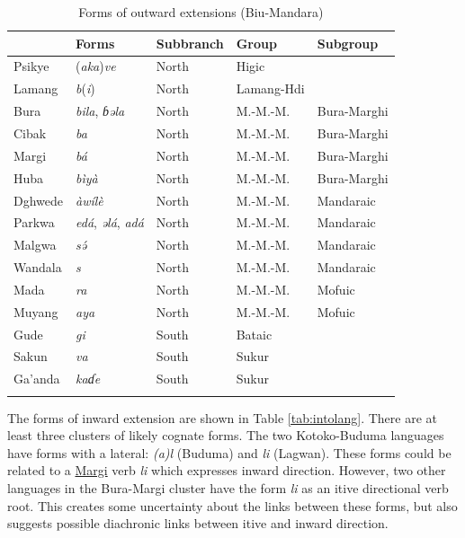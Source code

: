 \begin{table}[b]
	\caption{Forms of outward extensions (Biu-Mandara)}
	\label{tab:outlang}
	\begin{tabular}{lllll}
		\lsptoprule
		&     Forms    &  Subbranch & Group & Subgroup        \\
		\midrule
		Psikye 	&	(\textit{aka})\textit{ve}	&	North	&	Higic	&	\\	
		Lamang	&	\textit{b}(\textit{i})	&	North	&	Lamang-Hdi	&	\\	
		Bura	&	\textit{bila}, \textit{ɓəla}	&	North	&	M.-M.-M.	&	Bura-Marghi	\\
		Cibak	&	\textit{ba}	&	North	&	M.-M.-M.	&	Bura-Marghi	\\
		Margi	&	\textit{bá}	&	North	&	M.-M.-M.	&	Bura-Marghi	\\
		Huba	&	\textit{bìyà}	&	North	&	M.-M.-M.	&	Bura-Marghi	\\
		Dghwede	&	\textit{àwílè}	&	North	&	M.-M.-M.	&	Mandaraic	\\
		Parkwa	&	\textit{edá}, \textit{əlá}, \textit{adá}	&	North	&	M.-M.-M.	&	Mandaraic	\\
		Malgwa	&	\textit{sə́}	&	North	&	M.-M.-M.	&	Mandaraic	\\
		Wandala	&	\textit{s}	&	North	&	M.-M.-M.	&	Mandaraic	\\
		Mada	&	\textit{ra}	&	North	&	M.-M.-M.	&	Mofuic	\\
		Muyang	&	\textit{aya}	&	North	&	M.-M.-M.	&	Mofuic	\\
		Gude	&	\textit{gi}	&	South	&	Bataic	&		\\
		Sakun	&	\textit{va}	&	South	&	Sukur	&		\\
		Ga'anda	&	\textit{kaɗe}	&	South	&	Sukur	&		\\
		\lspbottomrule
	\end{tabular}
\end{table}

The forms of inward extension are shown in Table \ref{tab:intolang}. There are at least three clusters of likely cognate forms. The two Kotoko-Buduma languages have forms with a lateral: \textit{(a)l} (Buduma) and \textit{li} (Lagwan). These forms could be related to a \hyperref[marg]{Margi} verb \textit{li} which expresses inward direction. However, two other languages in the Bura-Margi cluster have the form \textit{li} as an itive directional verb root. This creates some uncertainty about the links between these forms, but also suggests possible diachronic links between itive and inward direction.


